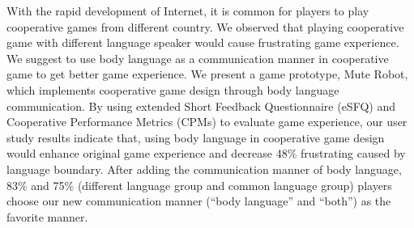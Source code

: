 
With the rapid development of Internet, it is common for players to play cooperative games from different country. 
We observed that playing cooperative game with different language speaker would cause frustrating game experience.
We suggest to use body language as a communication manner in cooperative game to get better game experience. 
We present a game prototype, Mute Robot, which implements cooperative game design through body language communication.
By using extended Short Feedback Questionnaire (eSFQ)\cite{eSFQ} and Cooperative Performance Metrics (CPMs)\cite{CPMs} to evaluate game experience, our user study results indicate that, using body language in cooperative game design would enhance original game experience and decrease 48\% frustrating caused by language boundary.
After adding the communication manner of body language, 83\% and 75\% (different language group and common language group) players choose our new communication manner (``body language'' and ``both'') as the favorite manner. 